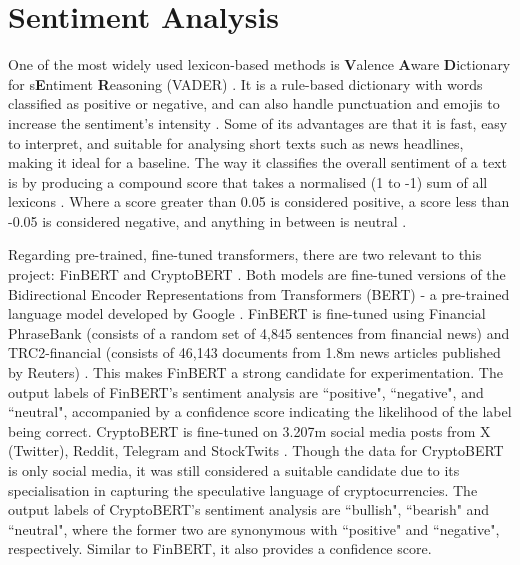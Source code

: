 \documentclass[ %
                    author={Raj Dhakan},
                supervisor={Dr. Ayush Joshi},
                    degree={MSc},
                     title={Ethereum Price Prediction using Internal and External Factors},
                  subtitle={},
                      type={},
                      year={2025}]{dissertation}
\begin{document}
\section{Sentiment Analysis}
\label{sec:sentiment_analysis}
One of the most widely used lexicon-based methods is \textbf{V}alence \textbf{A}ware \textbf{D}ictionary for s\textbf{E}ntiment \textbf{R}easoning (VADER) \cite{kumar2025evolving,hutto2014vader}. It is a rule-based dictionary with words classified as positive or negative, and can also handle punctuation and emojis to increase the sentiment's intensity \cite{RN104}. Some of its advantages are that it is fast, easy to interpret, and suitable for analysing short texts such as news headlines, making it ideal for a baseline. The way it classifies the overall sentiment of a text is by producing a compound score that takes a normalised (1 to -1) sum of all lexicons \cite{RN104}. Where a score greater than 0.05 is considered positive, a score less than -0.05 is considered negative, and anything in between is neutral \cite{RN104}. 

Regarding pre-trained, fine-tuned transformers, there are two relevant to this project: FinBERT \cite{araci2019finbert} and CryptoBERT \cite{kulakowski2023sentiment}. Both models are fine-tuned versions of the Bidirectional Encoder Representations from Transformers (BERT) - a pre-trained language model developed by Google \cite{kumar2025evolving}. FinBERT is fine-tuned using Financial PhraseBank (consists of a random set of 4,845 sentences from financial news) and TRC2-financial (consists of 46,143 documents from 1.8m news articles published by Reuters) \cite{araci2019finbert}. This makes FinBERT a strong candidate for experimentation. The output labels of FinBERT's sentiment analysis are ``positive", ``negative", and ``neutral", accompanied by a confidence score indicating the likelihood of the label being correct. CryptoBERT is fine-tuned on 3.207m social media posts from X (Twitter), Reddit, Telegram and StockTwits \cite{kulakowski2023sentiment}. Though the data for CryptoBERT is only social media, it was still considered a suitable candidate due to its specialisation in capturing the speculative language of cryptocurrencies. The output labels of CryptoBERT's sentiment analysis are ``bullish", ``bearish" and ``neutral", where the former two are synonymous with ``positive" and ``negative", respectively. Similar to FinBERT, it also provides a confidence score. 
\end{document}
